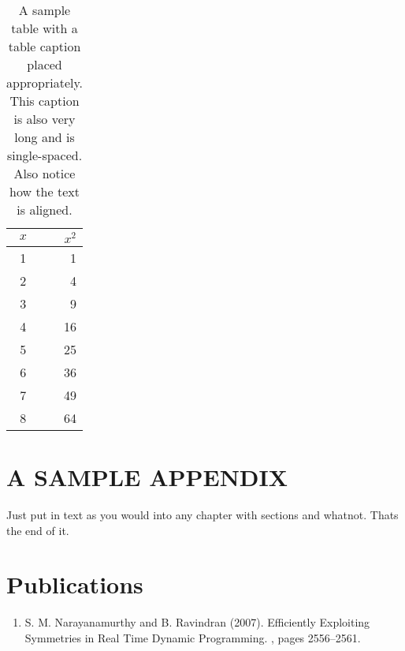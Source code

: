 \documentclass[MTech]{iitmdiss}
\begin{document}
 \begin{table}[htbp]
   \caption{A sample table with a table caption placed
     appropriately. This caption is also very long and is
     single-spaced.  Also notice how the text is aligned.}
   \begin{center}
   \begin{tabular}[c]{|c|r|} \hline
     $x$ & $x^2$ \\ \hline
     1  &  1   \\
     2  &  4  \\
     3  &  9  \\
     4  &  16  \\
     5  &  25  \\
     6  &  36  \\
     7  &  49  \\
     8  &  64  \\ \hline
   \end{tabular}
   \label{tab:sample}
   \end{center}
 \end{table}


 \appendix
 \chapter{A SAMPLE APPENDIX}
 Just put in text as you would into any chapter with sections and
 whatnot.  Thats the end of it.


\chapter*{Publications}
\vspace{-0.3cm}

\begin{enumerate}
\item S. M. Narayanamurthy and B. Ravindran (2007). \newblock
  Efficiently Exploiting Symmetries in Real Time Dynamic Programming. , pages 2556--2561.
\end{enumerate}


\pagebreak
\begin{singlespace}
  \begin{small}
	
  \end{small}
\end{singlespace}

\end{document}
